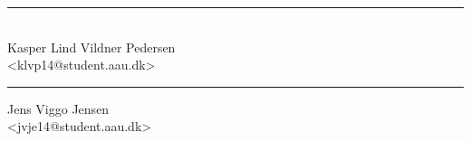 \hfill
\begin{minipage}[b]{0.45\textwidth}
 \centering
 \rule{\textwidth}{0.5pt}\\
  Kasper Lind Vildner Pedersen\\
 {\footnotesize <klvp14@student.aau.dk>}
\end{minipage}
\vspace{3\baselineskip}
\begin{center}
\begin{minipage}[b]{0.45\textwidth}
 \centering
 \rule{\textwidth}{0.5pt}
  Jens Viggo Jensen\\
 {\footnotesize <jvje14@student.aau.dk>}
\end{minipage}
\end{center}
